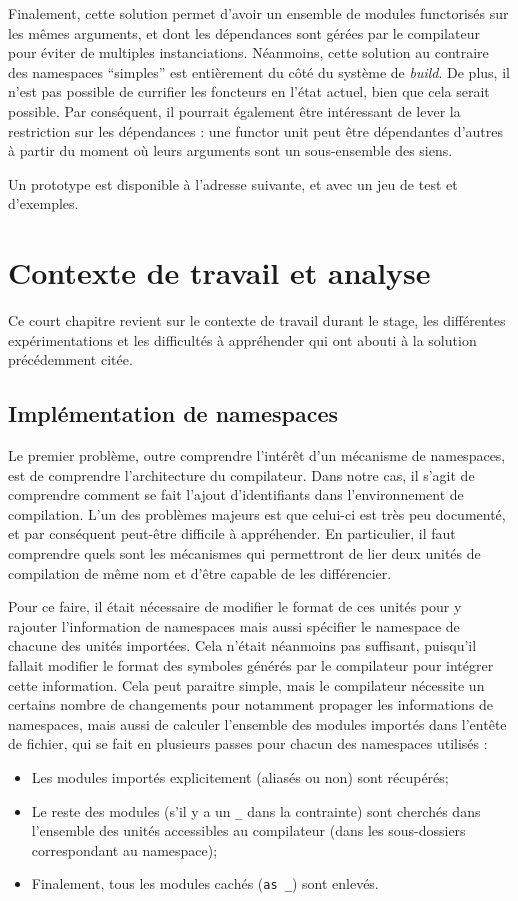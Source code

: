 \documentclass[11pt,a4paper]{report}
\begin{document}
Finalement, cette solution permet d'avoir un ensemble de modules functorisés sur
les mêmes arguments, et dont les dépendances sont gérées par le compilateur pour
éviter de multiples instanciations. Néanmoins, cette solution au contraire des
namespaces ``simples'' est entièrement du côté du système de \emph{build}. De
plus, il n'est pas possible de currifier les foncteurs en l'état actuel, bien
que cela serait possible. Par conséquent, il pourrait également être intéressant
de lever la restriction sur les dépendances : une functor unit peut être
dépendantes d'autres à partir du moment où leurs arguments sont un sous-ensemble
des siens.

\medskip

Un prototype est disponible à l'adresse suivante, et avec un
jeu de test et d'exemples.

\chapter{Contexte de travail et analyse}

Ce court chapitre revient sur le contexte de travail durant le stage, les
différentes expérimentations et les difficultés à appréhender qui ont abouti à
la solution précédemment citée.

\section{Implémentation de namespaces}

Le premier problème, outre comprendre l'intérêt d'un mécanisme de namespaces,
est de comprendre l'architecture du compilateur. Dans notre cas, il s'agit de
comprendre comment se fait l'ajout d'identifiants dans l'environnement de
compilation. L'un des problèmes majeurs est que celui-ci est très peu documenté,
et par conséquent peut-être difficile à appréhender. En particulier, il faut
comprendre quels sont les mécanismes qui permettront de lier deux unités de
compilation de même nom et d'être capable de les différencier.

Pour ce faire, il était nécessaire de modifier le format de ces unités pour y
rajouter l'information de namespaces mais aussi spécifier le namespace de
chacune des unités importées. Cela n'était néanmoins pas suffisant, puisqu'il
fallait modifier le format des symboles générés par le compilateur pour intégrer
cette information. Cela peut paraitre simple, mais le compilateur nécessite un
certains nombre de changements pour notamment propager les informations de
namespaces, mais aussi de calculer l'ensemble des modules importés dans l'entête
de fichier, qui se fait en plusieurs passes pour chacun des namespaces utilisés : 
\begin{itemize}
\item Les modules importés explicitement (aliasés ou non) sont récupérés;
\item Le reste des modules (s'il y a un \texttt{\_} dans la contrainte) sont
  cherchés dans l'ensemble des unités accessibles au compilateur (dans les
  sous-dossiers correspondant au namespace);
\item Finalement, tous les modules cachés (\lstinline{as _}) sont enlevés.
\end{itemize}
\end{document}
